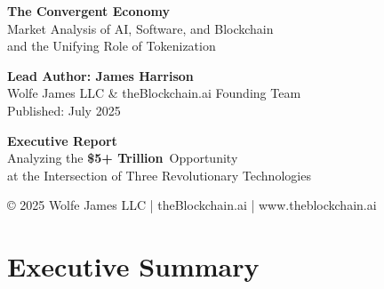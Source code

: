 \documentclass[11pt,a4paper]{report}
\newcommand{\marketvalue}[2]{\textcolor{trust}{\textbf{\$#1}}\,\textcolor{darkgray}{#2}}
\begin{document}
\begin{titlepage}
    \begin{center}
        {\Huge\bfseries\color{ocean} The Convergent Economy}\\[0.5cm]
        {\Large\color{sky} Market Analysis of \textcolor{ocean}{AI}, \textcolor{sky}{Software}, and \textcolor{sun}{Blockchain}}\\[0.3cm]
        {\Large\color{trust} and the Unifying Role of \textcolor{sun}{Tokenization}}\\[3cm]
        
        \begin{tcolorbox}[
            width=0.9\textwidth,
            colback=white!95,
            colframe=ocean!50,
            boxrule=1pt,
            arc=5pt,
            boxsep=10pt
        ]
            \centering
            {\large\bfseries\color{ocean} 
             Lead Author: James Harrison}\\[0.2cm]
            {\color{darkgray} 
             Wolfe James LLC \& theBlockchain.ai Founding Team}\\[0.5cm]
            {\color{darkgray} Published: July 2025}
        \end{tcolorbox}
        \vspace{1cm}
        
        \begin{tcolorbox}[
            width=0.8\textwidth,
            colback=sky!5,
            colframe=ocean,
            boxrule=3pt,
            arc=0pt,
            outer arc=0pt
        ]            \centering\large
            \textbf{Executive Report}\\[0.5cm]
            Analyzing the \marketvalue{5+ Trillion}{} Opportunity\\
            at the Intersection of Three Revolutionary Technologies
        \end{tcolorbox}
        
        \vfill
        
        {\small\color{darkgray} 
         © 2025 Wolfe James LLC | theBlockchain.ai | www.theblockchain.ai
        }
    \end{center}
\end{titlepage}

\tableofcontents

\chapter*{Executive Summary}
\end{document}
